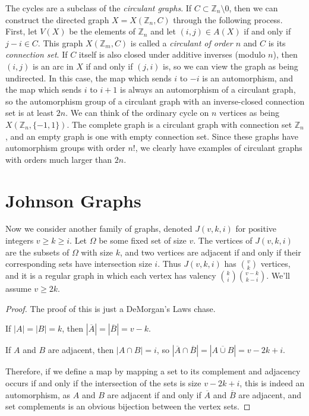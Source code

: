 The cycles are a subclass of the \textit{circulant graphs}.  If $C\subset \mathbb{Z}_n{\setminus}0$, then we can construct the directed graph $X=X(\mathbb{Z}_n,C)$ through the following process.  First, let $V(X)$ be the elements of $\mathbb{Z}_n$ and let $(i,j)\in A(X)$ if and only if $j-i\in C$.  This graph $X(\mathbb{Z}_m,C)$ is called a \textit{circulant of order $n$} and $C$ is its \textit{connection set}.  If $C$ itself is also closed under additive inverses (modulo $n$), then $(i,j)$ is an arc in $X$ if and only if $(j,i)$ is, so we can view the graph as being undirected.  In this case, the map which sends $i$ to $-i$ is an automorphism, and the map which sends $i$ to $i+1$ is always an automorphism of a circulant graph, so the automorphism group of a circulant graph with an inverse-closed connection set is at least $2n$.  We can think of the ordinary cycle on $n$ vertices as being $X(\mathbb{Z}_n,\{-1,1\})$.  The complete graph is a circulant graph with connection set $\mathbb{Z}_n$, and an empty graph is one with empty connection set.  Since these graphs have automorphism groups with order $n!$, we clearly have examples of circulant graphs with orders much larger than $2n$.

\section*{Johnson Graphs}

Now we consider another family of graphs, denoted $J(v,k,i)$ for positive integers $v\geq k\geq i$.  Let $\Omega$ be some fixed set of size $v$.  The vertices of $J(v,k,i)$ are the subsets of $\Omega$ with size $k$, and two vertices are adjacent if and only if their corresponding sets have intersection size $i$.  Thus $J(v,k,i)$ has $\binom{v}{k}$ vertices, and it is a regular graph in which each vertex has valency $\binom{k}{i}\binom{v-k}{k-i}$.  We'll assume $v\geq 2k$.


\begin{proof}
	The proof of this is just a DeMorgan's Laws chase.  
	
	If $|A|=|B|=k$, then $|\overline{A}|=|\overline{B}|=v-k$.
	
	If $A$ and $B$ are adjacent, then $|A\cap B|=i$, so $|\overline{A}\cap\overline{B}| = |\overline{A\cup B}| = v-2k+i$.
	
	Therefore, if we define a map by mapping a set to its complement and adjacency occurs if and only if the intersection of the sets is size $v-2k+i$, this is indeed an automorphism, as $A$ and $B$ are adjacent if and only if $\overline{A}$ and $\overline{B}$ are adjacent, and set complements is an obvious bijection between the vertex sets.
	
	
	
\end{proof}

